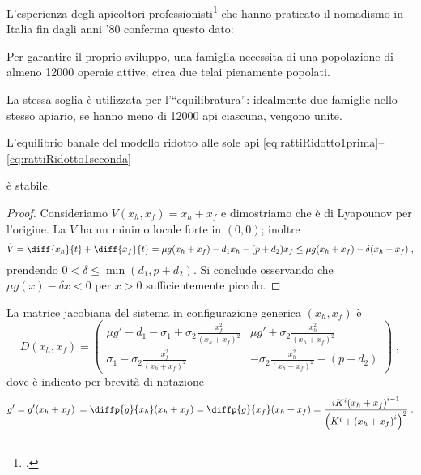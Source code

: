 L'esperienza degli apicoltori professionisti\footcite{privFDL,privFPan} che hanno praticato il nomadismo in Italia
fin dagli anni '80 conferma questo dato:
\begin{displayquote}
Per garantire il proprio sviluppo, una famiglia necessita di una popolazione di
almeno 12000 operaie attive; circa due telai pienamente popolati.

La stessa soglia è utilizzata per l'``equilibratura'': idealmente due famiglie nello stesso apiario,
se hanno meno di 12000 api ciascuna, vengono unite.
\end{displayquote}

\begin{proposizione}
    L'equilibrio banale del modello ridotto alle sole api
    \eqref{eq:rattiRidotto1prima}--\eqref{eq:rattiRidotto1seconda}

    è stabile.
\end{proposizione}

\begin{proof}
Consideriamo $V(x_h, x_f) = x_h + x_f$ e dimostriamo che è di Lyapounov per l'origine.
La $V$ ha un minimo locale forte in $(0,0)$; inoltre
$$\dot{V} = \diff{x_h}{t} + \diff{x_f}{t} = \mu g(x_h + x_f) -d_1 x_h - (p+d_2) x_f
\leq
 \mu g(x_h + x_f) - \delta (x_h + x_f)
\; ,$$
prendendo $0 < \delta \leq \min (d_1, p + d_2)$.
Si conclude osservando che $\mu g(x) - \delta x <0$ per $x>0$ sufficientemente piccolo.
\end{proof}

La matrice jacobiana del sistema in configurazione generica $(x_h, x_f)$ è
\begin{equation}
    D(x_h, x_f) =
    \begin{pmatrix}
        \mu g' -d_1 - \sigma_1 + \sigma_2 \frac{x_f^2}{{(x_h+x_f)}^2}
        & \mu g' + \sigma_2 \frac{x_h^2}{{(x_h+x_f)}^2}
        \\
        \sigma_1 - \sigma_2 \frac{x_f^2}{{(x_h+x_f)}^2}
        & - \sigma_2 \frac{x_h^2}{{(x_h+x_f)}^2} - (p+d_2)
    \end{pmatrix} \; ,
    \label{eq:r17jaco}
\end{equation}
dove è indicato per brevità di notazione
$$
    g' = g'(x_h+x_f) \coloneq \diffp{g}{{x_h}} (x_h + x_f) = \diffp{g}{{x_f}} (x_h + x_f) =
    \frac{ iK^i {(x_h + x_f)}^{i-1} }{ { \left( K^i + {(x_h +x_f)}^i \right)  }^2 }
    \; .
$$

